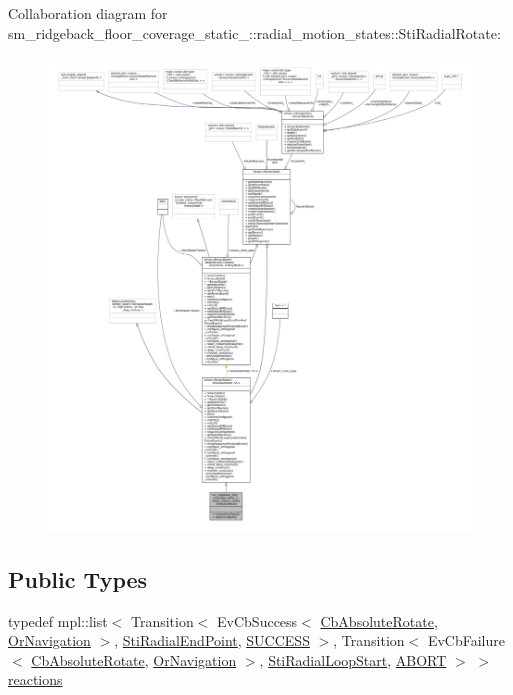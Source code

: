Collaboration diagram for sm\+\_\+ridgeback\+\_\+floor\+\_\+coverage\+\_\+static\+\_\+:\+:radial\+\_\+motion\+\_\+states\+:\+:Sti\+Radial\+Rotate\+:
\nopagebreak
\begin{figure}[H]
\begin{center}
\leavevmode
\includegraphics[width=350pt]{structsm__ridgeback__floor__coverage__static__1_1_1radial__motion__states_1_1StiRadialRotate__coll__graph}
\end{center}
\end{figure}
\subsection*{Public Types}
\begin{DoxyCompactItemize}
\item 
typedef mpl\+::list$<$ Transition$<$ Ev\+Cb\+Success$<$ \hyperlink{classcl__move__base__z_1_1CbAbsoluteRotate}{Cb\+Absolute\+Rotate}, \hyperlink{classsm__ridgeback__floor__coverage__static__1_1_1OrNavigation}{Or\+Navigation} $>$, \hyperlink{structsm__ridgeback__floor__coverage__static__1_1_1radial__motion__states_1_1StiRadialEndPoint}{Sti\+Radial\+End\+Point}, \hyperlink{structsmacc_1_1default__transition__tags_1_1SUCCESS}{S\+U\+C\+C\+E\+SS} $>$, Transition$<$ Ev\+Cb\+Failure$<$ \hyperlink{classcl__move__base__z_1_1CbAbsoluteRotate}{Cb\+Absolute\+Rotate}, \hyperlink{classsm__ridgeback__floor__coverage__static__1_1_1OrNavigation}{Or\+Navigation} $>$, \hyperlink{structsm__ridgeback__floor__coverage__static__1_1_1radial__motion__states_1_1StiRadialLoopStart}{Sti\+Radial\+Loop\+Start}, \hyperlink{structsmacc_1_1default__transition__tags_1_1ABORT}{A\+B\+O\+RT} $>$ $>$ \hyperlink{structsm__ridgeback__floor__coverage__static__1_1_1radial__motion__states_1_1StiRadialRotate_ab39c52adc47a6cbdb300211ac1b021ff}{reactions}
\end{DoxyCompactItemize}

